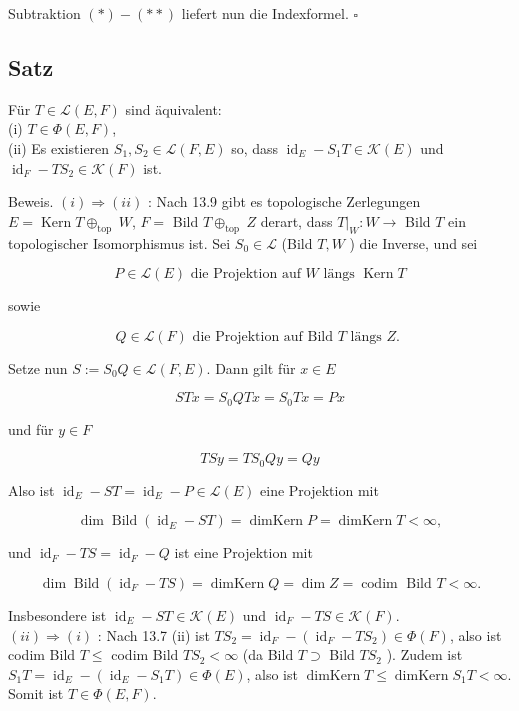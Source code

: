 \documentclass[10pt, letterpaper]{article}
\begin{document}
Subtraktion $(*)-(* *)$ liefert nun die Indexformel. \(\square\)

\subsection*{Satz}
Für $T \in \mathcal{L}(E, F)$ sind äquivalent:\\
(i) $T \in \Phi(E, F)$,\\
(ii) Es existieren $S_{1}, S_{2} \in \mathcal{L}(F, E)$ so, dass $\operatorname{id}_{E}-S_{1} T \in \mathcal{K}(E)$ und $\operatorname{id}_{F}-T S_{2} \in \mathcal{K}(F)$ ist.

Beweis. $(i) \Longrightarrow(i i)$ : Nach 13.9 gibt es topologische Zerlegungen $E=\operatorname{Kern} T \oplus_{\text {top }} W$, $F=$ Bild $T \oplus_{\text {top }} Z$ derart, dass $\left.T\right|_{W}: W \rightarrow$ Bild $T$ ein topologischer Isomorphismus ist. Sei $S_{0} \in \mathcal{L}$ (Bild $T, W$ ) die Inverse, und sei

$$
P \in \mathcal{L}(E) \text { die Projektion auf } W \text { längs } \operatorname{Kern} T
$$

sowie

$$
Q \in \mathcal{L}(F) \text { die Projektion auf Bild } T \text { längs } Z \text {. }
$$

Setze nun $S:=S_{0} Q \in \mathcal{L}(F, E)$. Dann gilt für $x \in E$

$$
S T x=S_{0} Q T x=S_{0} T x=P x
$$

und für $y \in F$

$$
T S y=T S_{0} Q y=Q y
$$

Also ist $\operatorname{id}_{E}-S T=\operatorname{id}_{E}-P \in \mathcal{L}(E)$ eine Projektion mit

$$
\operatorname{dim} \operatorname{Bild}\left(\operatorname{id}_{E}-S T\right)=\operatorname{dimKern} P=\operatorname{dimKern} T<\infty,
$$

und $\operatorname{id}_{F}-T S=\operatorname{id}_{F}-Q$ ist eine Projektion mit

$$
\operatorname{dim} \operatorname{Bild}\left(\operatorname{id}_{F}-T S\right)=\operatorname{dimKern} Q=\operatorname{dim} Z=\operatorname{codim} \text { Bild } T<\infty .
$$

Insbesondere ist $\operatorname{id}_{E}-S T \in \mathcal{K}(E)$ und $\operatorname{id}_{F}-T S \in \mathcal{K}(F)$.\\
$(i i) \Longrightarrow(i)$ : Nach 13.7 (ii) ist $T S_{2}=\operatorname{id}_{F}-\left(\operatorname{id}_{F}-T S_{2}\right) \in \Phi(F)$, also ist codim Bild $T \leq$ codim Bild $T S_{2}<\infty$ (da Bild $T \supset$ Bild $T S_{2}$ ). Zudem ist $S_{1} T= \operatorname{id}_{E}-\left(\operatorname{id}_{E}-S_{1} T\right) \in \Phi(E)$, also ist $\operatorname{dimKern} T \leq \operatorname{dimKern} S_{1} T<\infty$. Somit ist $T \in \Phi(E, F)$.
\end{document}
